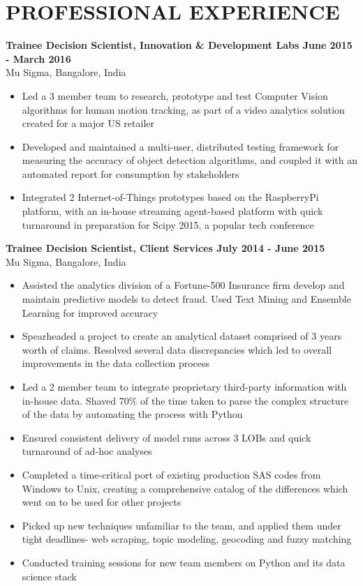 \documentclass{article}
\begin{document}
\section*{PROFESSIONAL EXPERIENCE}
\noindent
\textbf{Trainee Decision Scientist, Innovation \& Development Labs \hfill June 2015 - March 2016}\\
Mu Sigma, Bangalore, India
\begin{itemize}
	\item Led a 3 member team to research, prototype and test Computer Vision algorithms for human motion
tracking, as part of a video analytics solution created for a major US retailer
	\item Developed and maintained a multi-user, distributed testing framework for measuring the accuracy of object
detection algorithms, and coupled it with an automated report for consumption by stakeholders
	\item Integrated 2 Internet-of-Things prototypes based on the RaspberryPi platform, with an in-house streaming agent-based platform with quick turnaround in preparation for Scipy 2015, a popular tech conference
\end{itemize}
\textbf{Trainee Decision Scientist, Client Services \hfill July 2014 - June 2015}\\
Mu Sigma, Bangalore, India
\begin{itemize}
	\item Assisted the analytics division of a Fortune-500 Insurance firm develop and maintain predictive models to detect fraud. Used Text Mining and Ensemble Learning for improved accuracy
	\item Spearheaded a project to create an analytical dataset comprised of 3 years worth of claims. Resolved several data discrepancies which led to 
        overall improvements in the data collection process
    \item Led a 2 member team to integrate proprietary third-party information
        with in-house data. Shaved 70\% of the time taken to parse the complex
        structure of the data by automating the process with Python
	\item Ensured consistent delivery of model runs across 3 LOBs and quick turnaround of ad-hoc analyses
	\item Completed a time-critical port of existing production SAS codes from Windows to Unix, creating a
comprehensive catalog of the differences which went on to be used for other projects
	\item Picked up new techniques unfamiliar to the team, and applied them under tight deadlines- web scraping,
topic modeling, geocoding and fuzzy matching
	\item Conducted training sessions for new team members on Python and its data science stack
\end{itemize}
\end{document}
